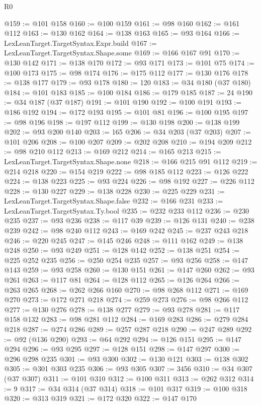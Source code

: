 \begin{lexlean}{R0}
\begin{coremodule}
@159 := @101 @158
@160 := @100 @159
@161 := @98 @160
@162 := @161 @112
@163 := @130 @162
@164 := @138 @163
@165 := @93 @164
@166 := LexLeanTarget.TargetSyntax.Expr.build
@167 := LexLeanTarget.TargetSyntax.Shape.some
@169 := @166 @167 @91
@170 := @130 @142
@171 := @138 @170
@172 := @93 @171
@173 := @101 @75
@174 := @100 @173
@175 := @98 @174
@176 := @175 @112
@177 := @130 @176
@178 := @138 @177
@179 := @93 @178
@180 := 120
@183 := @34 @180 (@37 @180)
@184 := @101 @183
@185 := @100 @184
@186 := @179 @185
@187 := 24
@190 := @34 @187 (@37 @187)
@191 := @101 @190
@192 := @100 @191
@193 := @186 @192
@194 := @172 @193
@195 := @101 @81
@196 := @100 @195
@197 := @98 @196
@198 := @197 @112
@199 := @130 @198
@200 := @138 @199
@202 := @93 @200 @140
@203 := 165
@206 := @34 @203 (@37 @203)
@207 := @101 @206
@208 := @100 @207
@209 := @202 @208
@210 := @194 @209
@212 := @98 @210 @112
@213 := @169 @212
@214 := @165 @213
@215 := LexLeanTarget.TargetSyntax.Shape.none
@218 := @166 @215 @91 @112
@219 := @214 @218
@220 := @154 @219
@222 := @98 @185 @112
@223 := @126 @222
@224 := @138 @223
@225 := @93 @224
@226 := @98 @192
@227 := @226 @112
@228 := @130 @227
@229 := @138 @228
@230 := @225 @229
@231 := LexLeanTarget.TargetSyntax.Shape.false
@232 := @166 @231
@233 := LexLeanTarget.TargetSyntax.Ty.bool
@235 := @232 @233 @112
@236 := @230 @235
@237 := @93 @236
@238 := @117 @39
@239 := @126 @131
@240 := @238 @239
@242 := @98 @240 @112
@243 := @169 @242
@245 := @237 @243 @218
@246 := @220 @245
@247 := @145 @246
@248 := @111 @162
@249 := @138 @248
@250 := @93 @249
@251 := @128 @142
@252 := @138 @251
@254 := @225 @252 @235
@256 := @250 @254 @235
@257 := @93 @256
@258 := @147 @143
@259 := @93 @258
@260 := @130 @151
@261 := @147 @260
@262 := @93 @261
@263 := @117 @81
@264 := @128 @112
@265 := @126 @264
@266 := @263 @265
@268 := @262 @266 @160
@270 := @98 @268 @112
@271 := @169 @270
@273 := @172 @271 @218
@274 := @259 @273
@276 := @98 @266 @112
@277 := @130 @276
@278 := @138 @277
@279 := @93 @278
@281 := @117 @158 @132
@283 := @98 @281 @112
@284 := @169 @283
@286 := @279 @284 @218
@287 := @274 @286
@289 := @257 @287 @218
@290 := @247 @289
@292 := @92 (@136 @290)
@293 := @64 @292
@294 := @126 @151
@295 := @147 @294
@296 := @93 @295
@297 := @128 @151
@298 := @147 @297
@300 := @296 @298 @235
@301 := @93 @300
@302 := @130 @121
@303 := @138 @302
@305 := @301 @303 @235
@306 := @93 @305
@307 := 3456
@310 := @34 @307 (@37 @307)
@311 := @101 @310
@312 := @100 @311
@313 := @262 @312
@314 := 9
@317 := @34 @314 (@37 @314)
@318 := @101 @317
@319 := @100 @318
@320 := @313 @319
@321 := @172 @320
@322 := @147 @170

\end{coremodule}
\end{lexlean}
